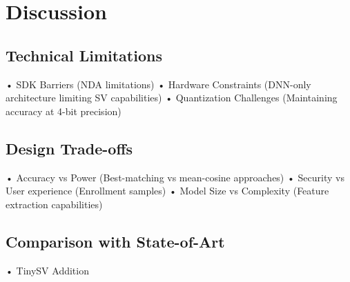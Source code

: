 \chapter{Discussion}
\label{cha:discussion}
\section{Technical Limitations}
\label{sec:technical limits}
• SDK Barriers (NDA limitations)\newline
• Hardware Constraints (DNN-only architecture limiting SV capabilities)\newline
• Quantization Challenges (Maintaining accuracy at 4-bit precision)\newline

\section{Design Trade-offs}
\label{sec:design trade-offs}
• Accuracy vs Power (Best-matching vs mean-cosine approaches)\newline
• Security vs User experience (Enrollment samples)\newline
• Model Size vs Complexity (Feature extraction capabilities)\newline

\section{Comparison with State-of-Art}
• TinySV Addition\newline 

\newpage